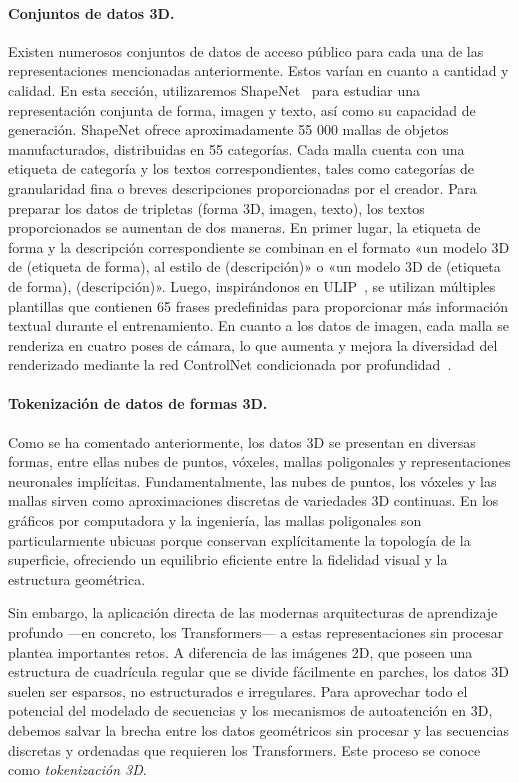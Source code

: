 \documentclass[../../book-main_es.tex]{subfiles}
\begin{document}
\paragraph{Conjuntos de datos 3D.}
Existen numerosos conjuntos de datos de acceso público para cada una de las
representaciones mencionadas anteriormente. Estos varían en cuanto a
cantidad y calidad. En esta sección, utilizaremos
ShapeNet~\cite{chang2015shapenet} para estudiar una representación conjunta de forma, imagen y texto,
así como su capacidad de generación. ShapeNet ofrece
aproximadamente 55 000 mallas de objetos manufacturados, distribuidas en 55 categorías.
Cada malla cuenta con una etiqueta de categoría y los textos correspondientes, tales como
categorías de granularidad fina o breves descripciones proporcionadas por el creador.
Para preparar los datos de tripletas (forma 3D, imagen, texto), los textos proporcionados
se aumentan de dos maneras.
En primer lugar, la etiqueta de forma y la descripción correspondiente se combinan en
el formato «un modelo 3D de (etiqueta de forma), al estilo de
(descripción)» o «un modelo 3D de (etiqueta de forma), (descripción)».
Luego, inspirándonos en ULIP~\cite{10203465}, se utilizan múltiples plantillas que contienen
65 frases predefinidas para proporcionar más información textual
durante el entrenamiento.
En cuanto a los datos de imagen, cada malla se renderiza en cuatro poses de cámara,
lo que aumenta y mejora la diversidad del renderizado mediante la red
ControlNet condicionada por profundidad~\cite{10377881}.

\paragraph{Tokenización de datos de formas 3D.}
\label{sec:3d_tokenization}
Como se ha comentado anteriormente, los datos 3D
se presentan en diversas formas, entre ellas nubes de puntos, vóxeles, mallas
poligonales y representaciones neuronales implícitas. Fundamentalmente, las
nubes de puntos, los vóxeles y las mallas sirven como aproximaciones discretas de
variedades 3D continuas. En los gráficos por computadora y la ingeniería,
las mallas poligonales son particularmente ubicuas porque conservan explícitamente
la topología de la superficie, ofreciendo un equilibrio eficiente entre
la fidelidad visual y la estructura geométrica.

Sin embargo, la aplicación directa de las modernas arquitecturas de aprendizaje profundo
---en concreto, los Transformers--- a estas representaciones sin procesar
plantea importantes retos. A diferencia de las imágenes 2D, que poseen una
estructura de cuadrícula regular que se divide fácilmente en parches, los datos 3D suelen ser
esparsos, no estructurados e irregulares. Para aprovechar todo el potencial del
modelado de secuencias y los mecanismos de autoatención en 3D, debemos salvar
la brecha entre los datos geométricos sin procesar y las secuencias discretas y ordenadas
que requieren los Transformers. Este proceso se conoce como
\textit{tokenización 3D}.
\end{document}
